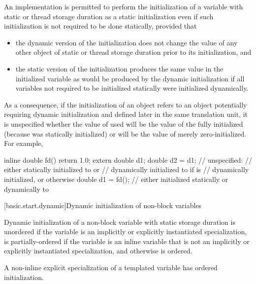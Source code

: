 \pnum
An implementation is permitted to perform the initialization of a
variable with static or thread storage duration as a static
initialization even if such initialization is not required to be done
statically, provided that
\begin{itemize}
\item
the dynamic version of the initialization does not change the
value of any other object of static or thread storage duration
prior to its initialization, and

\item
the static version of the initialization produces the same value
in the initialized variable as would be produced by the dynamic
initialization if all variables not required to be initialized statically
were initialized dynamically.
\end{itemize}
\begin{note}
As a consequence, if the initialization of an object  refers to an
object  potentially requiring dynamic initialization and defined
later in the same translation unit, it is unspecified whether the value of  used
will be the value of the fully initialized  (because  was statically
initialized) or will be the value of  merely zero-initialized. For example,
\begin{codeblock}
inline double fd() { return 1.0; }
extern double d1;
double d2 = d1;     // unspecified:
                    // either statically initialized to  or
                    // dynamically initialized to  if  is
                    // dynamically initialized, or  otherwise
double d1 = fd();   // either initialized statically or dynamically to 
\end{codeblock}
\end{note}

[basic.start.dynamic]{Dynamic initialization of non-block variables}

\pnum
{}%
%
%
Dynamic initialization of a non-block variable with static storage duration is
unordered if the variable is an implicitly or explicitly instantiated
specialization, is partially-ordered if the variable
is an inline variable that is not an implicitly or explicitly instantiated
specialization, and otherwise is ordered.
\begin{note}
A non-inline explicit specialization of a templated variable
has ordered initialization.
\end{note}

